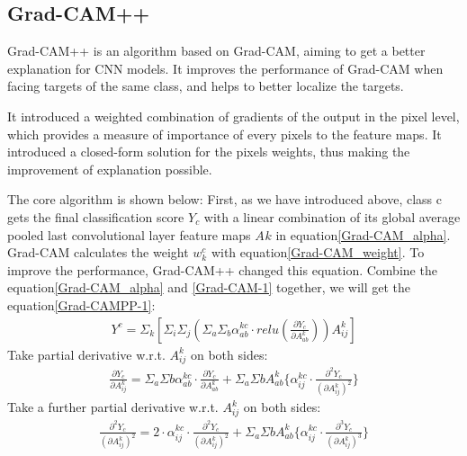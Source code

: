 \documentclass[conference]{IEEEtran}
\begin{document}
\subsection{Grad-CAM++}
Grad-CAM++ is an algorithm based on Grad-CAM, aiming to get a better explanation for CNN models. It improves the performance of Grad-CAM when facing targets of the same class, and helps to better localize the targets.\par
It introduced a weighted combination of gradients of the output in the pixel level, which provides a measure of importance of every pixels to the feature maps.
It introduced a closed-form solution for the pixels weights, thus making the improvement of explanation possible. \par
The core algorithm is shown below:
First, as we have introduced above, class c gets the final classification score $Y_{c}$ with a linear combination of its global average pooled last convolutional layer feature maps $A_{}k$ in equation\ref{Grad-CAM_alpha}.
Grad-CAM calculates the weight $w_{k}^{c}$ with equation\ref{Grad-CAM_weight}.  To improve the performance, Grad-CAM++ changed this equation.
Combine the equation\ref{Grad-CAM_alpha} and \ref{Grad-CAM-1} together, we will get the equation\ref{Grad-CAMPP-1}:
\begin{equation}
    \begin{aligned}
        Y^{c}=\Sigma_{k}[\Sigma_{i}\Sigma_{j}(\Sigma_{a}\Sigma_{b}\alpha_{ab}^{kc}·relu(\frac{\partial Y_{c}}{\partial A_{ab}^{k}}))A_{ij}^{k}]
        \label{Grad-CAMPP-1}
    \end{aligned}
\end{equation}
Take partial derivative w.r.t. $A_{ij}^{k}$ on both sides:
\begin{equation}
\begin{aligned}
\frac{\partial Y_{c}}{\partial A_{ij}^{k}}=\Sigma_{a}\Sigma{b}\alpha_{ab}^{kc}·\frac{\partial Y_{c}}{\partial A_{ab}^{k}}+\Sigma_{a}\Sigma{b}A_{ab}^{k}\{\alpha_{ij}^{kc}·\frac{\partial^{2} Y_{c}}{(\partial A_{ij}^{k} )^{2}}\}
\label{Grad-CAMPP-2}
\end{aligned}
\end{equation}
Take a further partial derivative w.r.t. $A_{ij}^{k}$ on both sides:
\begin{equation}
    \begin{aligned}
\frac{\partial^{2} Y_{c}}{(\partial A_{ij}^{k})^{2}}=2·\alpha_{ij}^{kc}·\frac{\partial^{2} Y_{c}}{(\partial A_{ij}^{k})^{2}}+\Sigma_{a}\Sigma{b}A_{ab}^{k}\{\alpha_{ij}^{kc}·\frac{\partial^{3} Y_{c}}{(\partial A_{ij}^{k})^{3}}\}
        \label{Grad-CAMPP-3}
    \end{aligned}
    \end{equation}
\end{document}
